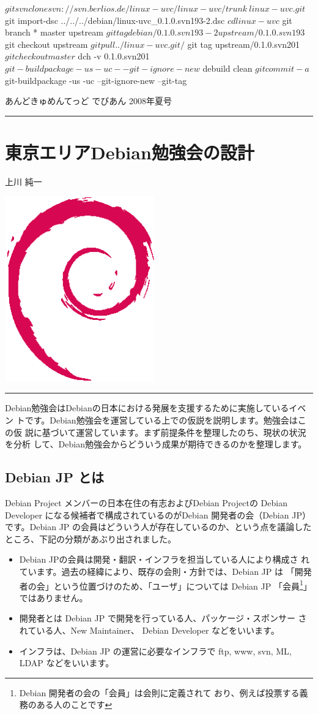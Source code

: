 \documentclass[mingoth,a4paper]{jsarticle}
\renewcommand{\dancersection}[2]{%
\newpage
あんどきゅめんてっど でびあん 2008年夏号
%
\vspace{0.1mm}\\
{\color{dancerlightblue}\rule{\hsize}{2mm}}

%
%
\begin{minipage}[t]{0.6\hsize}
\color{dancerdarkblue}
\vspace{1cm}
\section{#1}
\hfill{}#2\\
\end{minipage}
\begin{minipage}[t]{0.4\hsize}
\vspace{-2cm}
\hfill{}\includegraphics[height=8cm]{image200502/openlogo-nd.eps}\\
\vspace{-5cm}
\end{minipage}
%
%
{\color{dancerdarkblue}\rule{0.74\hsize}{2mm}}
%
\vspace{2cm}
}
\begin{document}
\begin{commandline}
$ git svn clone svn://svn.berlios.de/linux-uvc/linux-uvc/trunk\
 linux-uvc.git
$ git import-dsc  ../../../debian/linux-uvc_0.1.0.svn193-2.dsc
$ cd linux-uvc
$ git branch
* master
  upstream
$ git tag
debian/0.1.0.svn193-2
upstream/0.1.0.svn193
$ git checkout upstream
$ git pull ../linux-uvc.git/
$ git tag upstream/0.1.0.svn201
$ git checkout master
$ dch -v 0.1.0.svn201
$ git-buildpackage -us -uc --git-ignore-new
$ debuild clean
$ git commit -a
$ git-buildpackage -us -uc --git-ignore-new --git-tag
\end{commandline}



\dancersection{東京エリアDebian勉強会の設計}{上川 純一}
\label{sec:debmtg2007design}


Debian勉強会はDebianの日本における発展を支援するために実施しているイベン
トです。Debian勉強会を運営している上での仮説を説明します。勉強会はこの仮
説に基づいて運営しています。まず前提条件を整理したのち、現状の状況を分析
して、Debian勉強会からどういう成果が期待できるのかを整理します。

\subsection{Debian JP とは}

Debian Project メンバーの日本在住の有志およびDebian Projectの Debian
Developer になる候補者で構成されているのがDebian 開発者の会（Debian JP）
です。Debian JP の会員はどういう人が存在しているのか、という点を議論した
ところ、下記の分類があぶり出されました。

\begin{itemize}
 \item Debian JPの会員は開発・翻訳・インフラを担当している人により構成さ
	れています。過去の経緯により、既存の会則・方針では、Debian JP は
	「開発者の会」という位置づけのため、「ユーザ」については Debian
	JP 「会員\footnote{Debian 開発者の会の「会員」は会則に定義されて
       おり、例えば投票する義務のある人のことです}」ではありません。
 \item 開発者とは Debian JP で開発を行っている人、パッケージ・スポンサー
	されている人、New Maintainer、 Debian Developer などをいいます。
 \item インフラは、Debian JP の運営に必要なインフラで ftp, www, svn, ML,
       LDAP などをいいます。
\end{itemize}
\end{document}
